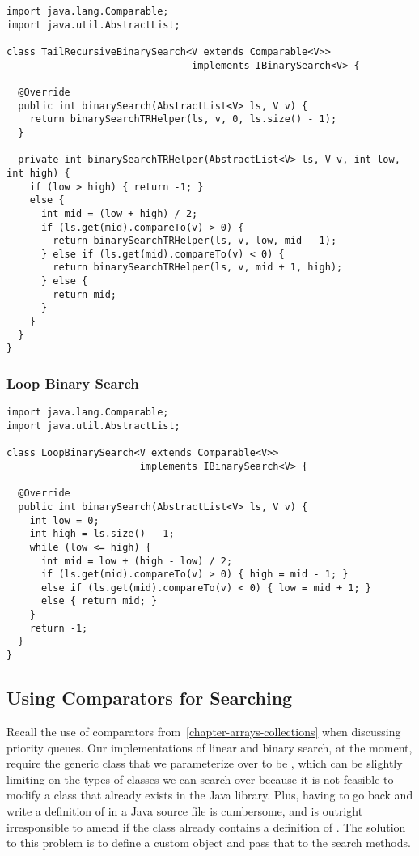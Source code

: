 \begin{lstlisting}[language=MyJava]
import java.lang.Comparable;
import java.util.AbstractList;

class TailRecursiveBinarySearch<V extends Comparable<V>> 
                                implements IBinarySearch<V> {

  @Override
  public int binarySearch(AbstractList<V> ls, V v) {
    return binarySearchTRHelper(ls, v, 0, ls.size() - 1);
  }

  private int binarySearchTRHelper(AbstractList<V> ls, V v, int low, int high) {
    if (low > high) { return -1; }
    else {
      int mid = (low + high) / 2;
      if (ls.get(mid).compareTo(v) > 0) { 
        return binarySearchTRHelper(ls, v, low, mid - 1); 
      } else if (ls.get(mid).compareTo(v) < 0) { 
        return binarySearchTRHelper(ls, v, mid + 1, high); 
      } else { 
        return mid; 
      }
    }
  }
}
\end{lstlisting}

\subsubsection*{Loop Binary Search}

\begin{lstlisting}[language=MyJava]
import java.lang.Comparable;
import java.util.AbstractList;
  
class LoopBinarySearch<V extends Comparable<V>> 
                       implements IBinarySearch<V> {
  
  @Override
  public int binarySearch(AbstractList<V> ls, V v) {
    int low = 0;
    int high = ls.size() - 1;
    while (low <= high) {
      int mid = low + (high - low) / 2;
      if (ls.get(mid).compareTo(v) > 0) { high = mid - 1; } 
      else if (ls.get(mid).compareTo(v) < 0) { low = mid + 1; } 
      else { return mid; }
    }
    return -1;
  }
}
\end{lstlisting}

\subsection{Using Comparators for Searching}
Recall the use of comparators from~\ref{chapter-arrays-collections} when discussing priority queues. 
Our implementations of linear and binary search, at the moment, require the generic class that we parameterize over to be , which can be slightly limiting on the types of classes we can search over because it is not feasible to modify a class that already exists in the Java library. 
Plus, having to go back and write a definition of  in a Java source file is cumbersome, and is outright irresponsible to amend if the class already contains a definition of .
The solution to this problem is to define a custom  object and pass that to the search methods. 

